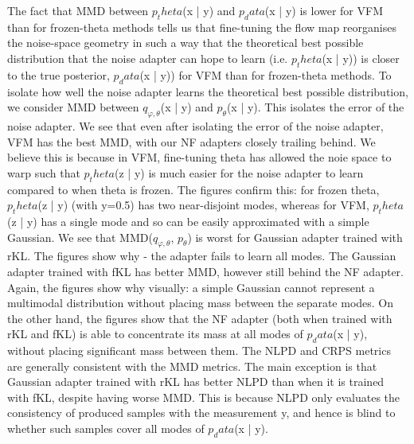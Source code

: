 \documentclass[12pt,a4paper]{report}
\begin{document}
The fact that MMD between $p_theta$(x | y) and $p_data$(x | y) is lower for VFM than for frozen-theta methods tells us that fine-tuning the flow map reorganises the noise-space geometry in such a way that the theoretical best possible distribution that the noise adapter can hope to learn (i.e. $p_theta$(x | y)) is closer to the true posterior, $p_data$(x | y)) for VFM than for frozen-theta methods. 
To isolate how well the noise adapter learns the theoretical best possible distribution, we consider MMD between $q_{φ,θ}$(x | y) and $p_θ$(x | y).
This isolates the error of the noise adapter.
We see that even after isolating the error of the noise adapter, VFM has the best MMD, with our NF adapters closely trailing behind. 
We believe this is because in VFM, fine-tuning theta has allowed the noie space to warp such that $p_theta$(z | y) is much easier for the noise adapter to learn compared to when theta is frozen. 
The figures confirm this: for frozen theta,  $p_theta$(z | y) (with y=0.5) has two near-disjoint modes, whereas for VFM,  $p_theta$(z | y) has a single mode and so can be easily approximated with a simple Gaussian. 
We see that  MMD($q_{φ,θ}$, $p_θ$) is worst for Gaussian adapter trained with rKL. The figures show why - the adapter fails to learn all modes. 
The Gaussian adapter trained with fKL has better MMD, however still behind the NF adapter. 
Again, the figures show why visually: a simple Gaussian cannot represent a multimodal distribution without placing mass between the separate modes. 
On the other hand, the figures show that the NF adapter (both when trained with rKL and fKL) is able to concentrate its mass at all modes of $p_data$(x | y), without placing significant mass between them. 
The NLPD and CRPS metrics are generally consistent with the MMD metrics. 
The main exception is that Gaussian adapter trained with rKL has better NLPD than when it is trained with fKL, despite having worse MMD.
This is because NLPD only evaluates the consistency of produced samples with the measurement y, and hence is blind to whether such samples cover all modes of $p_data$(x | y).
\end{document}

